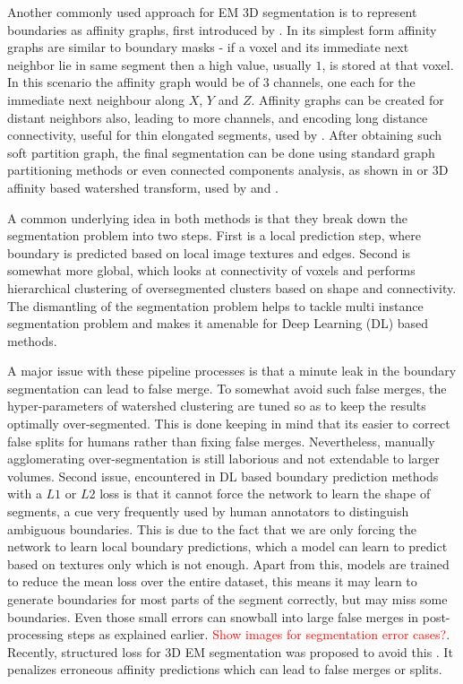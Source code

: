 Another commonly used approach for EM 3D segmentation is to represent boundaries as affinity graphs, first introduced by \cite{Turaga2010}. In its simplest form affinity graphs are similar to boundary masks - if a voxel and its immediate next neighbor lie in same segment then a high value, usually $1$, is stored at that voxel. In this scenario the affinity graph would be of $3$ channels, one each for the immediate next neighbour along $X$, $Y$ and $Z$. Affinity graphs can be created for distant neighbors also, leading to more channels, and encoding long distance connectivity, useful for thin elongated segments, used by \cite{Kisuk2017}. After obtaining such soft partition graph, the final segmentation can be done using standard graph partitioning methods or even connected components analysis, as shown in \cite{Turaga2010} or 3D affinity based watershed transform, used by \cite{Kisuk2017} and \cite{Aleks2015WatershedClustering}.

A common underlying idea in both methods is that they break down the segmentation problem into two steps. First is a local prediction step, where boundary is predicted based on local image textures and edges. Second is somewhat more global, which looks at connectivity of voxels and performs hierarchical clustering of oversegmented clusters based on shape and connectivity. The dismantling of the segmentation problem helps to tackle multi instance segmentation problem and makes it amenable for Deep Learning (DL) based methods.

A major issue with these pipeline processes is that a minute leak in the boundary segmentation can lead to false merge. To somewhat avoid such false merges, the hyper-parameters of watershed clustering are tuned so as to keep the results optimally over-segmented. This is done keeping in mind that its easier to correct false splits for humans rather than fixing false merges. Nevertheless, manually agglomerating over-segmentation is still laborious and not extendable to larger volumes.
Second issue, encountered in DL based boundary prediction methods with a $L1$ or $L2$ loss is that it cannot force the network to learn the shape of segments, a cue very frequently used by human annotators to distinguish ambiguous boundaries. This is due to the fact that we are only forcing the network to learn local boundary predictions, which a model can learn to predict based on textures only which is not enough.
Apart from this, models are trained to reduce the mean loss over the entire dataset, this means it may learn to generate boundaries for most parts of the segment correctly, but may miss some boundaries. Even those small errors can snowball into large false merges in post-processing steps as explained earlier. \textcolor{red}{Show images for segmentation error cases?}. Recently, structured loss for 3D EM segmentation was proposed to avoid this \cite{Funke2019}. It penalizes erroneous affinity predictions which can lead to false merges or splits. 

